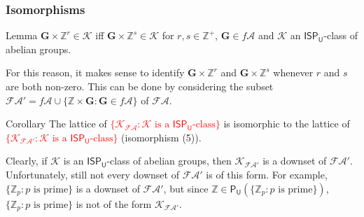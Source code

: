 \documentclass[professionalfont, 10pt]{beamer} %
\theoremstyle{plain}
\theoremstyle{definition}
\newcommand{\m}[1]{{\mathbf {#1} }}
\newcommand{\bb}[1]{\mathbb {#1}}
\begin{document}
\begin{frame}
\frametitle{Isomorphisms}
    \begin{block}{Lemma}
        $\m G \times \mathbb{Z}^r \in \mathcal{K}$ iff $\m G \times \mathbb{Z}^s \in \mathcal{K}$ for $r, s \in \bb{Z}^+$, $\m G \in f\mathcal{A}$ and $\mathcal{K}$ an $\mathsf{ISP_U}$-class of abelian groups.
    \end{block}
    \pause
    For this reason, it makes sense to identify $\m G \times \mathbb{Z}^r$ and $\m G \times \mathbb{Z}^s$ whenever $r$ and $s$ are both non-zero.
    This can be done by considering the subset $\mathcal{FA}' = f\mathcal{A} \cup \{\bb{Z} \times \m G: \m G \in f\mathcal{A}\}$ of $\mathcal{FA}$.
    \pause
    \begin{block}{Corollary}
        The lattice of \textcolor{red}{$\{\mathcal{K}_{\mathcal{FA}}: \mathcal{K} \text{ is a } \mathsf{ISP_U} \text{-class}\}$} is isomorphic to the lattice of \textcolor{red}{$\{\mathcal{K}_{\mathcal{FA}'}: \mathcal{K} \text{ is a } \mathsf{ISP_U} \text{-class}\}$} (isomorphism (5)).
    \end{block}
    \pause
    Clearly, if $\mathcal{K}$ is an $\mathsf{ISP_U}$-class of abelian groups, then $\mathcal{K}_{\mathcal{FA}'}$ is a downset of $\mathcal{FA}'$.
    Unfortunately, still not every downset of $\mathcal{FA}'$ is of this form.
    For example, $\{\bb{Z}_p: p \text{ is prime}\}$ is a downset of $\mathcal{FA}'$, but since $\bb{Z} \in \mathsf{P_U}(\{\bb{Z}_p: p \text{ is prime}\})$, $\{\bb{Z}_p: p \text{ is prime}\}$ is not of the form $\mathcal{K}_{\mathcal{FA}'}$.
\end{frame}
\end{document}
